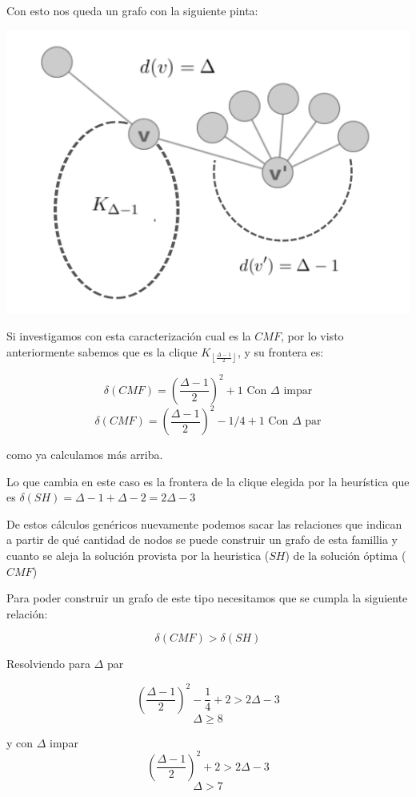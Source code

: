 Con esto nos queda un grafo con la siguiente pinta:


\begin{center} 
	\includegraphics[scale = 0.5]{img/ej3/constructiva_golosa/vincmf_carac.png} 
\end{center}

Si investigamos con esta caracterizaci\'on cual es la $CMF$, por lo visto anteriormente
sabemos que es la clique $K_{\left\lfloor \frac{\Delta -1}{2} \right\rfloor}$, 
y su frontera es:

\[ \boxed{\delta(CMF) = (\frac{\Delta -1}{2})^2 +1} \text{ Con $\Delta$ impar} \]
\[ \boxed{\delta(CMF) = (\frac{\Delta -1 }{2})^2 -1/4 +1} \text{ Con $\Delta$ par}\]

como ya calculamos m\'as arriba.

Lo que cambia en este caso es la frontera de la clique elegida por la heur\'istica
que es $\delta(SH) = \Delta -1 + \Delta -2 = 2 \Delta -3$

De estos c\'alculos gen\'ericos nuevamente podemos sacar las relaciones que indican
a partir de qu\'e cantidad de nodos se puede construir un grafo de esta famillia
y cuanto se aleja la soluci\'on provista por la heuristica ($SH$) de la soluci\'on 
\'optima ($CMF$)

Para poder construir un grafo de este tipo necesitamos que se cumpla la siguiente 
relaci\'on:

\[ \delta(CMF) > \delta(SH) \]

Resolviendo para $\Delta$ par

\[ (\frac{\Delta -1}{2})^2 -\frac{1}{4} + 2 > 2 \Delta -3 \]
\[ \Delta \geq 8 \]

y con $\Delta$ impar
\[ (\frac{\Delta -1}{2})^2 + 2 > 2 \Delta -3 \]
\[ \Delta > 7 \]

